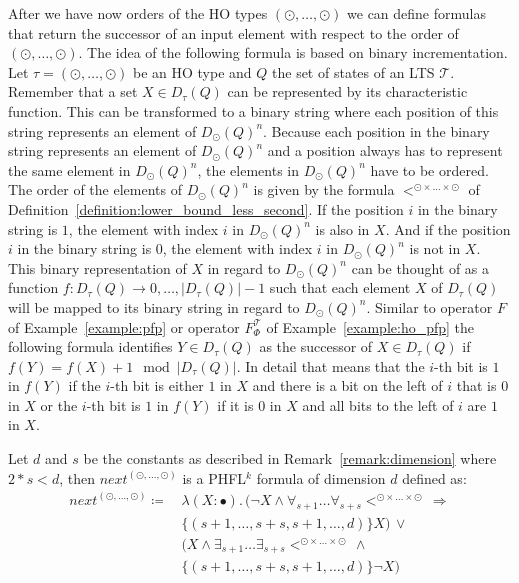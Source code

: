 After we have now orders of the HO types $(\odot, \dots, \odot)$ we can define formulas that return the successor of
an input element with respect to the order of $(\odot, \dots, \odot)$. The idea of the following formula is based on
binary incrementation. Let $\tau = (\odot, \dots, \odot)$ be an HO type and $Q$ the set of states of an LTS
$\mathcal{T}$. Remember that a set $X \in D_\tau(Q)$ can be represented by its characteristic
function. This can be transformed to a binary string where each position of this string represents an element of
$D_{\odot}(Q)^n$. Because each position in the binary string represents an element of $D_{\odot}
(Q)^n$ and a position always has to represent the same element in $D_{\odot}(Q)^n$, the elements
in $D_{\odot}(Q)^n$ have to be ordered. The order of the elements of $D_{\odot}(Q)^n$ is given by
the formula $<^{\odot \times \dots \times \odot}$ of Definition~\ref{definition:lower_bound_less_second}. If the position
$i$ in the binary string is $1$, the element with index $i$ in $D_{\odot}(Q)^n$ is
also in $X$. And if the position $i$ in the binary string is $0$, the element with index $i$ in $D_{\odot}
(Q)^n$ is not in $X$. This binary representation of $X$ in regard to $D_{\odot}
(Q)^n$ can be thought of as a function $f \colon D_\tau(Q) \rightarrow 
{0, \dots, |D_\tau(Q)| - 1}$ such that
each element $X$ of $D_\tau(Q)$ will be mapped to its binary string in regard to 
$D_{\odot}(Q)^n$. Similar to operator $F$ of Example~\ref{example:pfp} or operator 
$F_\Phi^\mathcal{T}$ of Example~\ref{example:ho_pfp} the following formula identifies $Y \in 
D_\tau(Q)$ as the successor of $X \in D_\tau(Q)$ if $f(Y) = f(X) + 1 
\mod |D_\tau(Q)|$. In detail that means that the $i$-th bit is $1$ in $f(Y)$ if 
the $i$-th bit is either $1$ in $X$ and there is a bit on the left of $i$ that is $0$ in 
$X$ or the $i$-th bit is $1$ in $f(Y)$ if it is $0$ in $X$ and all bits to the left of $i$ are $1$ in $X
$. 

\begin{definition}
    \label{definition:lower_bounds_next_second}
    Let $d$ and $s$ be the constants as described in Remark~\ref{remark:dimension} where $2*s < d$, then $next^{(\odot, \dots, \odot)}$
    is a PHFL$^k$ formula of dimension $d$ defined as:
    \begin{align*}
        next^{(\odot, \dots, \odot)} \coloneqq &\,\lambda (X \colon \bullet).\, (\neg X \wedge \forall_{s +
        1}\dots\forall_{s + s}<^{\odot \times \dots \times \odot}\, \Rightarrow \\&\,\{(s +
        1, \dots, s + s, s + 1, \dots, d)\} X) \,\vee \\&\,(X \wedge \exists_{s + 1}\dots\exists_{s + s} <^{\odot
        \times \dots \times \odot} \,\wedge \\&\,\{(s + 1, \dots, s + s, s + 1, \dots, d)\}
        \neg X)
    \end{align*}
\end{definition}

